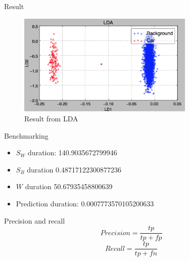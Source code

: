 \documentclass[handout]{beamer}
\begin{document}

\begin{frame}{Result}
    {\centering
    \begin{figure}[H]
        \includegraphics[width=0.75\textwidth]{project_03/lda_final.png}
        \caption{Result from LDA}
    \end{figure}
    }
\end{frame}


\begin{frame}{Benchmarking}
    \begin{itemize}
        \item $S_W$ duration: 140.9035672799946
        \item $S_B$ duration 0.48717122300877236
        \item $W$ duration 50.67935458800639
        \item Prediction duration: 0.0007773570105200633
    \end{itemize}
\end{frame}
\note{}

\begin{frame}{Precision and recall}
\Huge
\begin{equation}
    Precision = \frac{tp}{tp + fp}
\end{equation}
\begin{equation}
    Recall = \frac{tp}{tp + fn}
\end{equation}
\end{frame}
\end{document}
